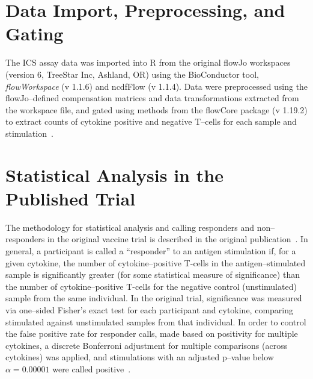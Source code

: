 \documentclass[11pt]{article}
\begin{document}
 
\section{Data Import, Preprocessing, and Gating}
The ICS assay data was imported into R from the original flowJo workspaces (version 6, TreeStar Inc, Ashland, OR)  using the BioConductor tool, \textit{flowWorkspace} (v 1.1.6) and ncdfFlow (v 1.1.4). Data were preprocessed using the flowJo--defined compensation matrices and data transformations extracted from the workspace file, and gated using methods from the flowCore package (v 1.19.2) to extract counts of cytokine positive and negative T--cells for each sample and stimulation~\cite{Hahne:2009vv}.

\section{Statistical Analysis in the Published Trial}
\label{supp:statpublished}
The methodology for statistical analysis and calling responders and non--responders in the original vaccine trial is described in the original publication~\cite{Peiperl:2010ej}. In general, a participant is called a ``responder'' to an antigen stimulation if, for a given cytokine, the number of cytokine--positive T-cells in the antigen--stimulated sample is significantly greater (for some statistical measure of significance) than the number of cytokine--positive T-cells for the negative control (unstimulated) sample from the same individual. In the original trial, significance was measured via one--sided Fisher's exact test for each participant and cytokine, comparing stimulated against unstimulated samples from that individual. In order to control the false positive rate for responder calls, made based on positivity for multiple cytokines, a discrete Bonferroni adjustment for multiple comparisons (across cytokines) was applied, and stimulations with an adjusted p--value below $\alpha = 0.00001$ were called positive~\cite{Horton:2007tsa}. 
\end{document}
